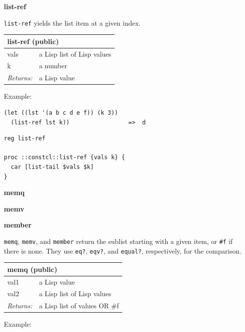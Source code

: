 \documentclass[twoside,9pt]{report}
\begin{document}
\textbf{list-ref}


\texttt{list-ref} yields the list item at a given index.

\begin{tabular}{ |l l| }
\hline
\multicolumn{2}{|l|}{list-ref (public)} \\
\hline
vals & a Lisp list of Lisp values \\
k & a number \\
\textit{Returns:} & a Lisp value \\
\hline
\end{tabular}


Example:

\noindent\makebox[\linewidth]{\rule{\linewidth}{0.4pt}}
\begin{lstlisting}
(let ((lst '(a b c d e f)) (k 3))
  (list-ref lst k))                 =>  d
\end{lstlisting}
\noindent\makebox[\linewidth]{\rule{\linewidth}{0.4pt}}
\noindent\makebox[\linewidth]{\rule{\linewidth}{0.4pt}}
\begin{lstlisting}
reg list-ref
 
proc ::constcl::list-ref {vals k} {
  car [list-tail $vals $k]
}
\end{lstlisting}
\noindent\makebox[\linewidth]{\rule{\linewidth}{0.4pt}}

\textbf{memq}


\textbf{memv}


\textbf{member}


\texttt{memq}, \texttt{memv}, and \texttt{member} return the sublist starting with a given item, or \texttt{\#f} if there is none. They use \texttt{eq?}, \texttt{eqv?}, and \texttt{equal?}, respectively, for the comparison.

\begin{tabular}{ |l l| }
\hline
\multicolumn{2}{|l|}{memq (public)} \\
\hline
val1 & a Lisp value \\
val2 & a Lisp list of Lisp values \\
\textit{Returns:} & a Lisp list of values OR \#f \\
\hline
\end{tabular}


Example:
\end{document}
